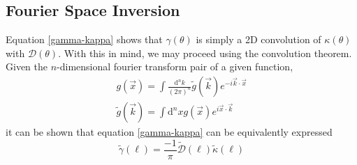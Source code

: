 \documentclass[12pt,preprint]{aastex}			%
\newcommand{\dd}{\mathrm{d}} %
\begin{document}
\subsection{Fourier Space Inversion}
Equation \ref{gamma-kappa} shows that $\gamma(\theta)$ is simply a 2D
convolution of $\kappa(\theta)$ with $\mathcal D(\theta)$.  With this in mind,
we may proceed using the convolution theorem.  Given the $n$-dimensional
fourier transform pair of a given function,
\begin{eqnarray}
  \label{ft}
  g(\vec x) = \int \frac{\dd^nk}{(2\pi)^n} \tilde{g}(\vec k)
  e^{-i\vec k\cdot\vec x}\\
  \label{ift}
  \tilde{g}(\vec k) = \int \dd^nx g(\vec x)e^{i\vec x\cdot\vec k}
\end{eqnarray}
it can be shown that equation \ref{gamma-kappa} can be equivalently expressed
\begin{equation}
  \tilde \gamma(\ell) 
  = \frac{-1}{\pi} \widetilde{\mathcal{D}}(\ell)\tilde\kappa(\ell)
\end{equation}
\end{document}

